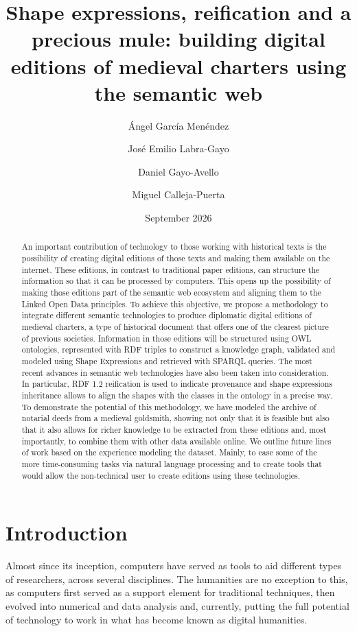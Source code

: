 \documentclass{article}
\title{Shape expressions, reification and a precious mule: building digital editions of medieval charters using the semantic web}
\author{Ángel García Menéndez}
\author{José Emilio Labra-Gayo}
\author{Daniel Gayo-Avello}
\author{Miguel Calleja-Puerta}
\date{September 2026}
\begin{document}
\maketitle

\begin{abstract}
An important contribution of technology to those working with historical texts is the possibility of creating digital editions of those texts and making them available on the internet.
These editions, in contrast to traditional paper editions, can structure the information so that it can be processed by computers.
This opens up the possibility of making those editions part of the semantic web ecosystem and aligning them to the Linked Open Data principles.
To achieve this objective, we propose a methodology to integrate different semantic technologies to produce diplomatic digital editions of medieval charters, a type of historical document that offers one of the clearest picture of previous societies.
Information in those editions will be structured using OWL ontologies, represented with RDF triples to construct a knowledge graph, validated and modeled using Shape Expressions and retrieved with SPARQL queries.
The most recent advances in semantic web technologies have also been taken into consideration. In particular, RDF 1.2 reification is used to indicate provenance and shape expressions inheritance allows to align the shapes with the classes in the ontology in a precise way.
To demonstrate the potential of this methodology, we have modeled the archive of notarial deeds from a medieval goldsmith, showing not only that it is feasible but also that it also allows for richer knowledge to be extracted from these editions and, most importantly, to combine them with other data available online.
We outline future lines of work based on the experience modeling the dataset.
Mainly, to ease some of the more time-consuming tasks via natural language processing and to create tools that would allow the non-technical user to create editions using these technologies.
\end{abstract}

\section{Introduction}

Almost since its inception, computers have served as tools to aid different types of researchers, across several disciplines.
The humanities are no exception to this, as computers first served as a support element for traditional techniques, then evolved into numerical and data analysis and, currently, putting the full potential of technology to work in what has become known as digital humanities\cite{peponaskis2024history}.
\end{document}
